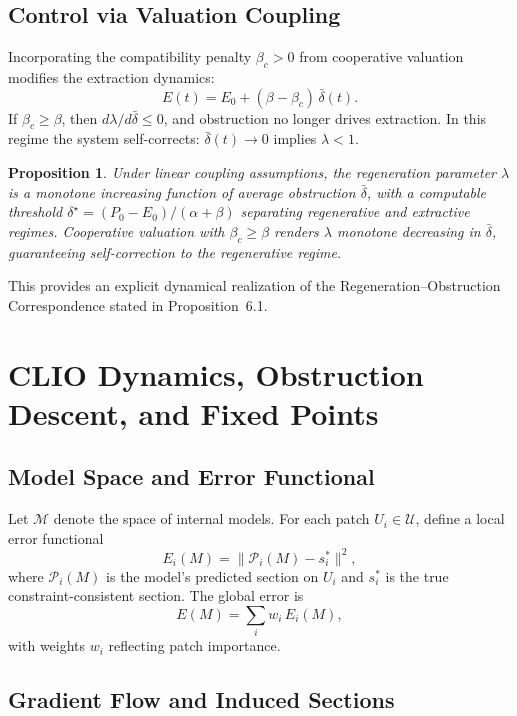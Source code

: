 \documentclass[12pt]{article}
\newtheorem{proposition}{Proposition}
\begin{document}
\subsection{Control via Valuation Coupling}

Incorporating the compatibility penalty $\beta_c > 0$ from cooperative valuation modifies the extraction dynamics:
\begin{equation}
E(t) = E_0 + (\beta - \beta_c)\,\bar{\delta}(t).
\end{equation}
If $\beta_c \ge \beta$, then $d\lambda/d\bar{\delta} \le 0$, and obstruction no longer drives extraction. In this regime the system self-corrects: $\bar{\delta}(t) \to 0$ implies $\lambda < 1$.

\begin{proposition}
Under linear coupling assumptions, the regeneration parameter $\lambda$ is a monotone increasing function of average obstruction $\bar{\delta}$, with a computable threshold $\delta^\star = (P_0 - E_0)/(\alpha + \beta)$ separating regenerative and extractive regimes. Cooperative valuation with $\beta_c \ge \beta$ renders $\lambda$ monotone decreasing in $\bar{\delta}$, guaranteeing self-correction to the regenerative regime.
\end{proposition}

This provides an explicit dynamical realization of the Regeneration--Obstruction Correspondence stated in Proposition~6.1.

\section{CLIO Dynamics, Obstruction Descent, and Fixed Points}

\subsection{Model Space and Error Functional}

Let $\mathcal{M}$ denote the space of internal models. For each patch $U_i \in \mathcal{U}$, define a local error functional
\[
E_i(M) = \bigl\|\mathcal{P}_i(M) - s_i^\ast\bigr\|^2,
\]
where $\mathcal{P}_i(M)$ is the model's predicted section on $U_i$ and $s_i^\ast$ is the true constraint-consistent section. The global error is
\[
E(M) = \sum_i w_i\,E_i(M),
\]
with weights $w_i$ reflecting patch importance.

\subsection{Gradient Flow and Induced Sections}
\end{document}

